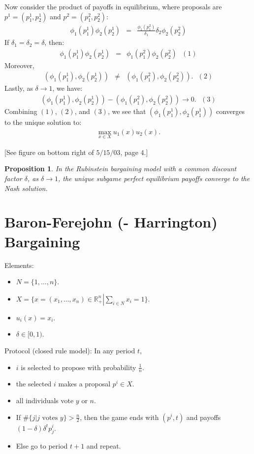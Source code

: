 \documentclass[12pt]{article}
\newtheorem{propo}{Proposition}[section]
\newcommand{\n}{\noindent}
\newcommand{\s}{\vspace{5mm}}
\begin{document}
\s
\n Now consider the product of payoffs in equilibrium, where proposals are $p^1=(p_1^1,p_2^1)$ and $p^2=(p_1^2,p_2^2)$:
\begin{eqnarray*}
\phi_1(p_1^1)\phi_2(p_2^1)&=&\frac{\phi_1(p_1^2)}{\delta_1}\delta_2\phi_2(p_2^2)
\end{eqnarray*} If $\delta_1=\delta_2=\delta$, then:
\begin{eqnarray*}
\phi_1(p_1^1)\phi_2(p_2^1)&=&\phi_1(p_1^2)\phi_2(p_2^2)\mbox{ }(1)
\end{eqnarray*}  Moreover,
\begin{eqnarray*}
\left(\phi_1(p_1^1),\phi_2(p_2^1)\right)&\neq&\left(\phi_1(p_1^2),\phi_2(p_2^2)\right).\mbox{ }(2)
\end{eqnarray*}Lastly, as $\delta\to 1$, we have:
\begin{eqnarray*}
\left(\phi_1(p_1^1),\phi_2(p_2^1)\right)-\left(\phi_1(p_1^2),\phi_2(p_2^2)\right)\to0.\mbox{ }(3)
\end{eqnarray*}Combining $(1)$, $(2)$, and $(3)$, we see that $\left(\phi_1(p_1^1),\phi_2(p_1^1)\right)$ converges to the unique solution to:
\begin{eqnarray*}
\max_{x\in X}u_1(x)u_2(x).
\end{eqnarray*}
\begin{center}
[See figure on bottom right of $5/15/03$, page 4.]
\end{center}

\s
\n\begin{propo}  In the Rubinstein bargaining model with a common discount factor $\delta$, as $\delta\to 1$, the unique subgame perfect equilibrium payoffs converge to the Nash solution.
\end{propo}

\section{Baron-Ferejohn (- Harrington) Bargaining}
\s
\n  Elements:
\begin{itemize}
\item $N=\{1,\hdots,n\}$.
\item $X=\{x=(x_1,\hdots,x_n)\in\mathbb{R}_+^n\left|\sum_{i\in N}x_i=1\right.\}$.
\item $u_i(x)=x_i$.
\item $\delta\in[0,1)$.
\end{itemize}

\s
\n  Protocol (closed rule model):  In any period $t$,
\begin{itemize}
\item $i$ is selected to propose with probability $\frac{1}{n}$.
\item the selected $i$ makes a proposal $p^i\in X$.
\item all individuals vote $y$ or $n$.
\item If $\#\{j|j\mbox{ votes }y\}>\frac{n}{2}$, then the game ends with $(p^i,t)$ and payoffs $(1-\delta)\delta^tp_j^i$.
\item Else go to period $t+1$ and repeat.
\end{itemize}
\end{document}
